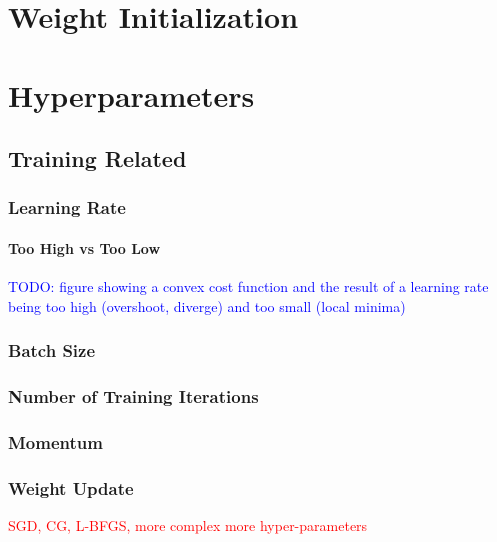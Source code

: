 \section{Weight Initialization}






\section{Hyperparameters}

\subsection{Training Related}

\subsubsection{Learning Rate}

\paragraph{Too High vs Too Low}

\textcolor{blue}{TODO: figure showing a convex cost function and the result of a learning rate being too high (overshoot, diverge) and too small (local minima)}

\subsubsection{Batch Size}

\subsubsection{Number of Training Iterations}

\subsubsection{Momentum}

\subsubsection{Weight Update}

\textcolor{red}{SGD, CG, L-BFGS, more complex more hyper-parameters}

